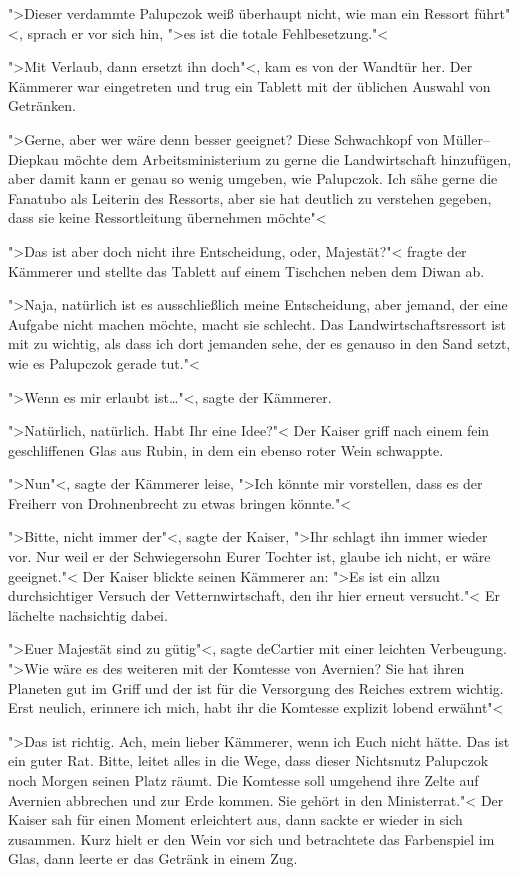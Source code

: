\documentclass[11pt,twoside,openany]{scrbook}
\begin{document}
">Dieser verdammte Palupczok weiß überhaupt nicht, wie man ein Ressort führt"<, sprach er vor sich hin, ">es ist die totale Fehlbesetzung."<

">Mit Verlaub, dann ersetzt ihn doch"<, kam es von der Wandtür her. Der Kämmerer war eingetreten und trug ein Tablett mit der üblichen Auswahl von Getränken.

">Gerne, aber wer wäre denn besser geeignet? Diese Schwachkopf von Müller--Diepkau möchte dem Arbeitsministerium zu gerne die Landwirtschaft hinzufügen, aber damit kann er genau so wenig umgeben, wie Palupczok. Ich sähe gerne die Fanatubo als Leiterin des Ressorts, aber sie hat deutlich zu verstehen gegeben, dass sie keine Ressortleitung übernehmen möchte"<

">Das ist aber doch nicht ihre Entscheidung, oder, Majestät?"< fragte der Kämmerer und stellte das Tablett auf einem Tischchen neben dem Diwan ab.

">Naja, natürlich ist es ausschließlich meine Entscheidung, aber jemand, der eine Aufgabe nicht machen möchte, macht sie schlecht. Das Landwirtschaftsressort ist mit zu wichtig, als dass ich dort jemanden sehe, der es genauso in den Sand setzt, wie es Palupczok gerade tut."<

">Wenn es mir erlaubt ist\dots"<, sagte der Kämmerer.

">Natürlich, natürlich. Habt Ihr eine Idee?"< Der Kaiser griff nach einem fein geschliffenen Glas aus Rubin, in dem ein ebenso roter Wein schwappte.

">Nun"<, sagte der Kämmerer leise, ">Ich könnte mir vorstellen, dass es der Freiherr von Drohnenbrecht zu etwas bringen könnte."<

">Bitte, nicht immer der"<, sagte der Kaiser, ">Ihr schlagt ihn immer wieder vor. Nur weil er der Schwiegersohn Eurer Tochter ist, glaube ich nicht, er wäre geeignet."< Der Kaiser blickte seinen Kämmerer an: ">Es ist ein allzu durchsichtiger Versuch der Vetternwirtschaft, den ihr hier erneut versucht."< Er lächelte nachsichtig dabei.

">Euer Majestät sind zu gütig"<, sagte deCartier mit einer leichten Verbeugung. ">Wie wäre es des weiteren mit der Komtesse von Avernien? Sie hat ihren Planeten gut im Griff und der ist für die Versorgung des Reiches extrem wichtig. Erst neulich, erinnere ich mich, habt ihr die Komtesse explizit lobend erwähnt"<

">Das ist richtig. Ach, mein lieber Kämmerer, wenn ich Euch nicht hätte. Das ist ein guter Rat. Bitte, leitet alles in die Wege, dass dieser Nichtsnutz Palupczok noch Morgen seinen Platz räumt. Die Komtesse soll umgehend ihre Zelte auf Avernien abbrechen und zur Erde kommen. Sie gehört in den Ministerrat."< Der Kaiser sah für einen Moment erleichtert aus, dann sackte er wieder in sich zusammen. Kurz hielt er den Wein vor sich und betrachtete das Farbenspiel im Glas, dann leerte er das Getränk in einem Zug.
\end{document}
